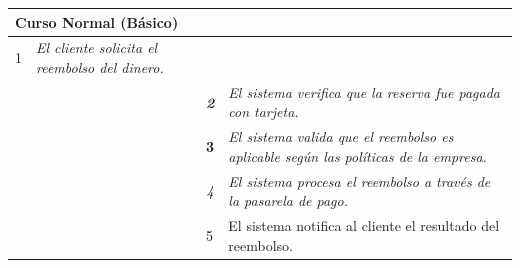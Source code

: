 \begin{table}[H]
    \begin{tabular}{llllllll}
    \hline
    \multicolumn{8}{|l|}{\cellcolor[HTML]{F2F2F2}Curso Normal (Básico)}                                                                                                                                                                                                                                                                          \\ \hline
    \multicolumn{1}{|c|}{1}  & \multicolumn{1}{l|}{{\color[HTML]{808080} \textit{El cliente solicita el reembolso del dinero.}}} & \multicolumn{1}{l|}{{\color[HTML]{808080} }}                    & \multicolumn{5}{l|}{{\color[HTML]{808080} }}                                                                                            \\ \hline
    \multicolumn{1}{|c|}{}   & \multicolumn{1}{l|}{{\color[HTML]{808080} \textit{}}}                                                 & \multicolumn{1}{c|}{{\color[HTML]{808080} \textit{\textbf{2}}}} & \multicolumn{5}{p{6cm}|}{{\color[HTML]{808080} \textit{El sistema verifica que la reserva fue pagada con tarjeta.}}}                         \\ \hline
    \multicolumn{1}{|l|}{}   & \multicolumn{1}{l|}{{\color[HTML]{808080} }}                                                          & \multicolumn{1}{l|}{{\color[HTML]{808080} \textbf{3}}}          & \multicolumn{5}{p{6cm}|}{{\color[HTML]{808080} \textit{El sistema valida que el reembolso es aplicable según las políticas de la empresa.}}} \\ \hline
    \multicolumn{1}{|l|}{}   & \multicolumn{1}{l|}{{\color[HTML]{808080} }}                                                          & \multicolumn{1}{c|}{{\color[HTML]{808080} \textit{4}}}          & \multicolumn{5}{p{6cm}|}{{\color[HTML]{808080} \textit{El sistema procesa el reembolso a través de la pasarela de pago.}}}                   \\ \hline
    \multicolumn{1}{|l|}{}   & \multicolumn{1}{l|}{{\color[HTML]{808080} }}                                                          & \multicolumn{1}{l|}{{\color[HTML]{808080} 5}}                   & \multicolumn{5}{p{6cm}|}{{\color[HTML]{808080} El sistema notifica al cliente el resultado del reembolso.}}                                  \\ \hline
    \end{tabular}
    \end{table}

